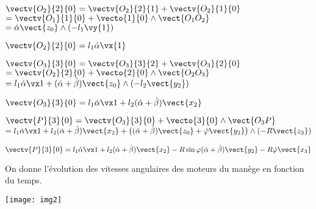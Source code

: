 \ifprof
\begin{corrige}
$ \vectv{O_2}{2}{0} =\vectv{O_2}{2}{1}+\vectv{O_2}{1}{0}$ 
$=\vectv{O_1}{1}{0}+\vecto{1}{0}\wedge\vect{O_1 O_2}$
$= \dot\alpha\vect{z_0} \wedge (-l_1 \vy{1})$

$\vectv{O_2}{2}{0}= l_1\dot\alpha\vx{1}$

$\vectv{O_3}{3}{0} =\vectv{O_3}{3}{2}+\vectv{O_3}{2}{0}$
$=\vectv{O_2}{2}{0}+\vecto{2}{0}\wedge \vect{O_2 O_3}$
$=l_1\dot\alpha\vx1+(\dot\alpha+\dot\beta)\vect{z_0}\wedge (-l_2 \vect{y_2})$

$\vectv{O_3}{3}{0}=l_1\dot\alpha\vx1+l_2(\dot\alpha+\dot\beta)\vect{x_2}$

$\vectv{P}{3}{0}=\vectv{O_3}{3}{0}+\vecto{3}{0}\wedge\vect{O_3 P}$	$=l_1\dot\alpha\vx1+l_2(\dot\alpha+\dot\beta)\vect{x_2}+ \left((\dot\alpha+\dot\beta)\vect{z_0}+\dot\varphi\vect{y_2}\right)\wedge(-R\vect{z_3})$

$\vectv{P}{3}{0}=l_1\dot\alpha\vx1+l_2(\dot\alpha+\dot\beta)\vect{x_2}-R\sin\varphi(\dot\alpha+\dot\beta)\vect{y_2}-R\dot\varphi\vect{x_3}$
\end{corrige}\else\fi

\vspace{.3cm}

On donne l'évolution des vitesses angulaires des moteurs du manège en fonction du temps.
\begin{center}
\texttt{[image: img2]}
\end{center}

